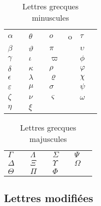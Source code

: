 \begin{table}[h]
  \caption{Lettres grecques minuscules}
  \label{tab:math:grecques}
  \begin{tabularx}{1.0\linewidth}{lXlXlXlX}
    $\alpha$      & \cmd{\alpha}      & $\theta$    & \cmd{\theta} &
    $o$           & o                 & $\tau$      & \cmd{\tau} \\
    $\beta$       & \cmd{\beta}       & $\vartheta$ & \cmd{\vartheta} &
    $\pi$         & \cmd{\pi}         & $\upsilon$  & \cmd{\upsilon} \\
    $\gamma$      & \cmd{\gamma}      & $\iota$     & \cmd{\iota} &
    $\varpi$      & \cmd{\varpi}      & $\phi$      & \cmd{\phi} \\
    $\delta$      & \cmd{\delta}      & $\kappa$    & \cmd{\kappa} &
    $\rho$        & \cmd{\rho}        & $\varphi$   & \cmd{\varphi} \\
    $\epsilon$    & \cmd{\epsilon}    & $\lambda$   & \cmd{\lambda} &
    $\varrho$     & \cmd{\varrho}     & $\chi$      & \cmd{\chi} \\
    $\varepsilon$ & \cmd{\varepsilon} & $\mu$       & \cmd{\mu} &
    $\sigma$      & \cmd{\sigma}      & $\psi$      & \cmd{\psi} \\
    $\zeta$       & \cmd{\zeta}       & $\nu$       & \cmd{\nu} &
    $\varsigma$   & \cmd{\varsigma}   & $\omega$    & \cmd{\omega} \\
    $\eta$        & \cmd{\eta}        & $\xi$       & \cmd{\xi}
  \end{tabularx}
\end{table}

\begin{table}[h]
  \caption{Lettres grecques majuscules}
  \label{tab:math:Grecques}
  \begin{tabularx}{1.0\linewidth}{lXlXlXlX}
    $\Gamma$    & \cmd{\Gamma}   &
    $\Lambda$   & \cmd{\Lambda}  &
    $\Sigma$    & \cmd{\Sigma}   &
    $\Psi$      & \cmd{\Psi}     \\
    $\Delta$    & \cmd{\Delta}   &
    $\Xi$       & \cmd{\Xi}      &
    $\Upsilon$  & \cmd{\Upsilon} &
    $\Omega$    & \cmd{\Omega}   \\
    $\Theta$    & \cmd{\Theta}   &
    $\Pi$       & \cmd{\Pi}      &
    $\Phi$      & \cmd{\Phi}
  \end{tabularx}
\end{table}

\subsection{Lettres modifiées}
\label{tab:math:symboles:mathcal}

